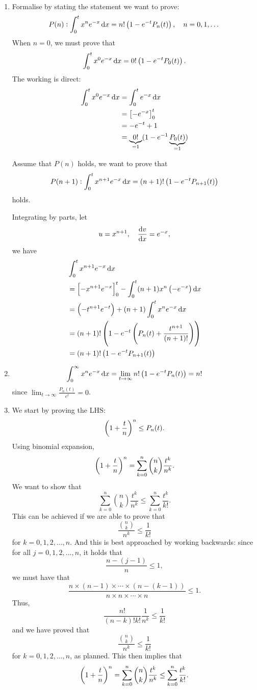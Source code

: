 \begin{enumerate}
\begin{solution} \
\begin{enumerate}[label=(\roman*)]
\item Formalise by stating the statement we want to prove:
\[ P(n):\int_0^tx^ne^{-x}\dd{x}=n!\left(1-e^{-t}P_n(t)\right), \quad n=0,1,\dots \]
When $n=0$, we must prove that
\[ \int_0^tx^0e^{-x}\dd{x}=0!\left(1-e^{-t}P_0(t)\right). \]
The working is direct:
\begin{align*}
\int_0^tx^0e^{-x}\dd{x}&=\int_0^te^{-x}\dd{x}\\
&=\left[-e^{-x}\right]_0^t\\
&=-e^{-t}+1\\
&=\underbrace{0!}_{=1}(1-e^{-1}\underbrace{P_0(t)}_{=1})
\end{align*}

Assume that $P(n)$ holds, we want to prove that
\[ P(n+1):\int_0^tx^{n+1}e^{-x}\dd{x}=(n+1)!\left(1-e^{-t}P_{n+1}(t)\right) \]
holds.

Integrating by parts, let
\[ u=x^{n+1}, \quad \dv{v}{x}=e^{-x}, \]
we have
\begin{align*}
&\int_0^tx^{n+1}e^{-x}\dd{x}\\
&=\left[-x^{n+1}e^{-x}\right]_0^t-\int_0^t(n+1)x^n\left(-e^{-x}\right)\dd{x}\\
&=\left(-t^{n+1}e^{-t}\right)+(n+1)\int_0^tx^ne^{-x}\dd{x}\\
&=(n+1)!\left(1-e^{-t}\left(P_n(t)+\frac{t^{n+1}}{(n+1)!}\right)\right)\\
&=(n+1)!\left(1-e^{-t}P_{n+1}(t)\right)
\end{align*}

\item \[ \int_0^\infty x^ne^{-x}\dd{x}=\lim_{t\to\infty}n!\left(1-e^{-t}P_n(t)\right)=n! \]
since $\displaystyle\lim_{t\to\infty}\frac{P_n(t)}{e^t}=0$.

\item We start by proving the LHS:
\[ \left(1+\frac{t}{n}\right)^n\le P_n(t). \]
Using binomial expansion,
\[ \left(1+\frac{t}{n}\right)^n=\sum_{k=0}^n\binom{n}{k}\frac{t^k}{n^k}. \]
We want to show that 
\[ \sum_{k=0}^n\binom{n}{k}\frac{t^k}{n^k}\le\sum_{k=0}^n\frac{t^k}{k!}. \]
This can be achieved if we are able to prove that
\[ \frac{\binom{n}{k}}{n^k}\le\frac{1}{k!} \]
for $k=0,1,2,\dots,n$. And this is best approached by working backwards: since for all $j=0,1,2,\dots,n$, it holds that
\[ \frac{n-(j-1)}{n}\le1, \]
we must have that
\[ \frac{n\times(n-1)\times\cdots\times(n-(k-1))}{n\times n\times\cdots\times n}\le1. \]
Thus,
\[ \frac{n!}{(n-k)!k!}\frac{1}{n^k}\le\frac{1}{k!} \]
and we have proved that
\[ \frac{\binom{n}{k}}{n^k}\le\frac{1}{k!} \]
for $k=0,1,2,\dots,n$, as planned. This then implies that
\[ \left(1+\frac{t}{n}\right)^n=\sum_{k=0}^n\binom{n}{k}\frac{t^k}{n^k}\le\sum_{k=0}^n\frac{t^k}{k!}. \]


\end{enumerate}
\end{solution}
\end{enumerate}
